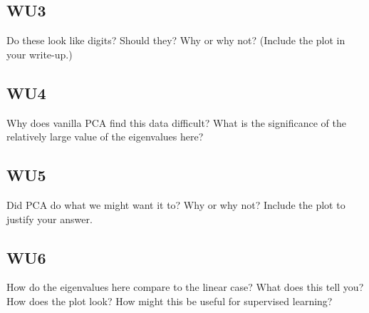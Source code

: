 \documentclass[a4paper,11pt]{article}
\begin{document}
\subsection{WU3}
\textsf{Do these look like digits? Should they? Why or why not?
(Include the plot in your write-up.)}\vspace{0.1in}


\subsection{WU4}
\textsf{Why does vanilla PCA find this data difficult? What is the
significance of the relatively large value of the eigenvalues here?}\vspace{0.1in}

\subsection{WU5}
\textsf{Did PCA do what we might want it to? Why or why not? Include
the plot to justify your answer.}


\subsection{WU6}
\textsf{How do the eigenvalues here compare to the linear case? What
does this tell you? How does the plot look? How might this be useful
for supervised learning?}\vspace{0.1in}

\end{document}
